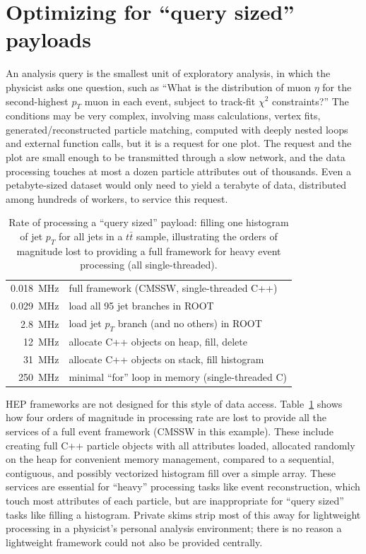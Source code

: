 \documentclass[a4paper]{jpconf}
\begin{document}
\section{Optimizing for ``query sized'' payloads}

An analysis query is the smallest unit of exploratory analysis, in which the physicist asks one question, such as ``What is the distribution of muon $\eta$ for the second-highest $p_T$ muon in each event, subject to track-fit $\chi^2$ constraints?'' The conditions may be very complex, involving mass calculations, vertex fits, generated/reconstructed particle matching, computed with deeply nested loops and external function calls, but it is a request for one plot. The request and the plot are small enough to be transmitted through a slow network, and the data processing touches at most a dozen particle attributes out of thousands. Even a petabyte-sized dataset would only need to yield a terabyte of data, distributed among hundreds of workers, to service this request.

\begin{table}
\caption{\label{tab:10k} Rate of processing a ``query sized'' payload: filling one histogram of jet $p_T$ for all jets in a $t\bar{t}$ sample, illustrating the orders of magnitude lost to providing a full framework for heavy event processing (all single-threaded).}

\vspace{0.25 cm}
\begin{center}
\begin{tabular}{r l}
0.018~MHz & full framework (CMSSW, single-threaded C++) \\
0.029~MHz & load all 95 jet branches in ROOT \\
2.8~MHz & load jet $p_T$ branch (and no others) in ROOT \\
12~MHz & allocate C++ objects on heap, fill, delete \\
31~MHz & allocate C++ objects on stack, fill histogram \\
250~MHz & minimal ``for'' loop in memory (single-threaded C)
\end{tabular}
\end{center}
\vspace{-0.5 cm}
\end{table}

HEP frameworks are not designed for this style of data access. Table~\ref{tab:10k} shows how four orders of magnitude in processing rate are lost to provide all the services of a full event framework (CMSSW in this example). These include creating full C++ particle objects with all attributes loaded, allocated randomly on the heap for convenient memory management, compared to a sequential, contiguous, and possibly vectorized histogram fill over a simple array. These services are essential for ``heavy'' processing tasks like event reconstruction, which touch most attributes of each particle, but are inappropriate for ``query sized'' tasks like filling a histogram. Private skims strip most of this away for lightweight processing in a physicist's personal analysis environment; there is no reason a lightweight framework could not also be provided centrally.
\end{document}
